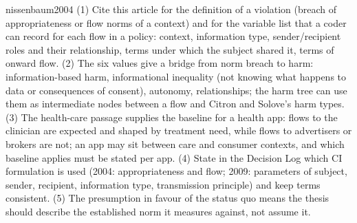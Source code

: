 \begin{papercard}{nissenbaum2004}
 (1) Cite this article for the definition of a violation (breach of appropriateness or flow norms of a context) and for the variable list that a coder can record for each flow in a policy: context, information type, sender/recipient roles and their relationship, terms under which the subject shared it, terms of onward flow. (2) The six values give a bridge from norm breach to harm: information-based harm, informational inequality (not knowing what happens to data or consequences of consent), autonomy, relationships; the harm tree can use them as intermediate nodes between a flow and Citron and Solove's harm types. (3) The health-care passage supplies the baseline for a health app: flows to the clinician are expected and shaped by treatment need, while flows to advertisers or brokers are not; an app may sit between care and consumer contexts, and which baseline applies must be stated per app. (4) State in the Decision Log which CI formulation is used (2004: appropriateness and flow; 2009: parameters of subject, sender, recipient, information type, transmission principle) and keep terms consistent. (5) The presumption in favour of the status quo means the thesis should describe the established norm it measures against, not assume it.
\end{papercard}
